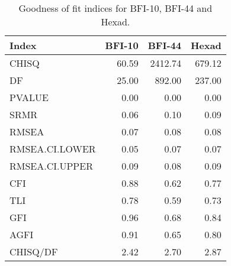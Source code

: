 \begin{table}[ht]
\centering
\begin{tabular}{@{}lrrr@{}}
  \toprule
{\textbf{Index}} & {\textbf{BFI-10}} & {\textbf{BFI-44}} & {\textbf{Hexad}} \\ 
  \midrule
CHISQ & 60.59 & 2412.74 & 679.12 \\ 
  DF & 25.00 & 892.00 & 237.00 \\ 
  PVALUE & 0.00 & 0.00 & 0.00 \\ 
  SRMR & 0.06 & 0.10 & 0.09 \\ 
  RMSEA & 0.07 & 0.08 & 0.08 \\ 
  RMSEA.CI.LOWER & 0.05 & 0.07 & 0.07 \\ 
  RMSEA.CI.UPPER & 0.09 & 0.08 & 0.09 \\ 
  CFI & 0.88 & 0.62 & 0.77 \\ 
  TLI & 0.78 & 0.59 & 0.73 \\ 
  GFI & 0.96 & 0.68 & 0.84 \\ 
  AGFI & 0.91 & 0.65 & 0.80 \\ 
  CHISQ/DF & 2.42 & 2.70 & 2.87 \\ 
   \bottomrule
\end{tabular}
\caption{Goodness of fit indices for BFI-10, BFI-44 and Hexad.} 
\label{tab:gofsbfihex}
\end{table}
